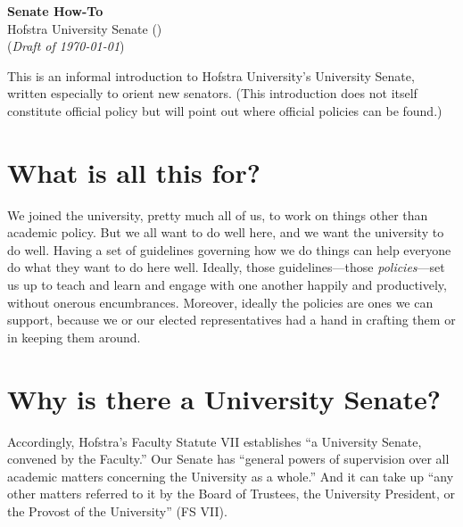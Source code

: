 \documentclass[12pt]{article}
\begin{document}
\thispagestyle{empty}



\begin{center}
  \textbf{\large Senate How-To} \\ Hofstra University Senate (\the\year) \\ (\emph{Draft of \today})
\end{center}



\noindent This is an informal introduction to Hofstra University's University
Senate, written especially to orient new senators. (This introduction
does not itself constitute official policy but will point out where
official policies can be found.)



\begin{center}
\begin{minipage}[c]{4.25in} %
\tableofcontents
\end{minipage}
\end{center}



\section{What is all this for?}\label{what-is-all-this-for}

We joined the university, pretty much all of us, to work on things other
than academic policy. But we all want to do well here, and we want the
university to do well. Having a set of guidelines governing how we do
things can help everyone do what they want to do here well. Ideally,
those guidelines---those \emph{policies}---set us up to teach and learn
and engage with one another happily and productively, without onerous
encumbrances. Moreover, ideally the policies are ones we can support,
because we or our elected representatives had a hand in crafting them or
in keeping them around.

\section{Why is there a University
Senate?}\label{why-is-there-a-university-senate}

Accordingly, Hofstra's Faculty Statute VII establishes ``a University
Senate, convened by the Faculty.'' Our Senate has ``general powers of
supervision over all academic matters concerning the University as a
whole.'' And it can take up ``any other matters referred to it by the
Board of Trustees, the University President, or the Provost of the
University'' (FS VII).
\end{document}
